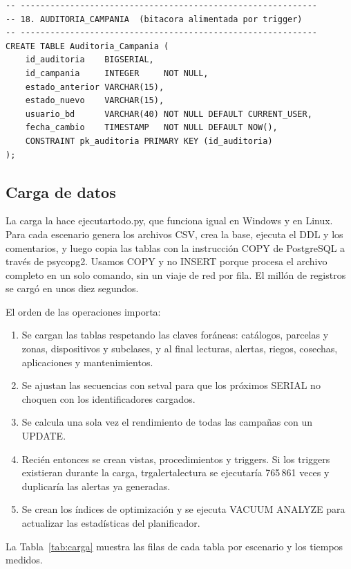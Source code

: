 \documentclass[11pt,letterpaper]{article}
\newcommand{\tbus}{\textunderscore\allowbreak}
\newcommand{\tb}[1]{{\ttfamily\let\_\tbus #1}}
\begin{document}
\begin{lstlisting}[style=sql, title={01\_ddl.sql}]
-- ------------------------------------------------------------
-- 18. AUDITORIA_CAMPANIA  (bitacora alimentada por trigger)
-- ------------------------------------------------------------
CREATE TABLE Auditoria_Campania (
    id_auditoria    BIGSERIAL,
    id_campania     INTEGER     NOT NULL,
    estado_anterior VARCHAR(15),
    estado_nuevo    VARCHAR(15),
    usuario_bd      VARCHAR(40) NOT NULL DEFAULT CURRENT_USER,
    fecha_cambio    TIMESTAMP   NOT NULL DEFAULT NOW(),
    CONSTRAINT pk_auditoria PRIMARY KEY (id_auditoria)
);
\end{lstlisting}


\subsection{Carga de datos}

La carga la hace \tb{ejecutar\_todo.py}, que funciona igual en Windows y en Linux. Para cada escenario genera los archivos CSV, crea la base, ejecuta el DDL y los comentarios, y luego copia las tablas con la instrucción \tb{COPY} de PostgreSQL a través de \tb{psycopg2}. Usamos \tb{COPY} y no \tb{INSERT} porque procesa el archivo completo en un solo comando, sin un viaje de red por fila. El millón de registros se cargó en unos diez segundos.

El orden de las operaciones importa:
\begin{enumerate}[leftmargin=1.6em,itemsep=0.1em]
\item Se cargan las tablas respetando las claves foráneas: catálogos, parcelas y zonas, dispositivos y subclases, y al final lecturas, alertas, riegos, cosechas, aplicaciones y mantenimientos.
\item Se ajustan las secuencias con \tb{setval} para que los próximos \tb{SERIAL} no choquen con los identificadores cargados.
\item Se calcula una sola vez el rendimiento de todas las campañas con un \tb{UPDATE}.
\item Recién entonces se crean vistas, procedimientos y triggers. Si los triggers existieran durante la carga, \tb{trg\_alerta\_lectura} se ejecutaría 765\,861 veces y duplicaría las alertas ya generadas.
\item Se crean los índices de optimización y se ejecuta \tb{VACUUM ANALYZE} para actualizar las estadísticas del planificador.
\end{enumerate}

La Tabla~\ref{tab:carga} muestra las filas de cada tabla por escenario y los tiempos medidos.
\end{document}
